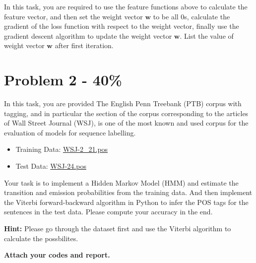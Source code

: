 \documentclass{article}
\begin{document}
In this task, you are required to use the feature functions above to calculate the feature vector,
and then set the weight vector $\mathbf{w}$ to be all 0s,
calculate the gradient of the loss function with respect to the weight vector,
finally use the gradient descent algorithm to update the weight vector $\mathbf{w}$.
List the value of weight vector $\mathbf{w}$ after first iteration. 

\section*{Problem 2 - 40\%}

In this task, you are provided The English Penn Treebank (PTB) corpus with tagging, 
and in particular the section of the corpus corresponding 
to the articles of Wall Street Journal (WSJ), 
is one of the most known and used corpus for the evaluation of models for sequence labelling.

\begin{itemize}
    \item Training Data: \href{https://drive.google.com/file/d/16H4D4nsntZVA4sXslWAy2nl8BX_gxofM/view?usp=sharing}{WSJ-2\_21.pos}
    \item Test Data: \href{https://drive.google.com/file/d/1yl_ea9VznZuauavGMLfLHxzcZf2yPil3/view?usp=sharing}{WSJ-24.pos}
\end{itemize}

Your task is to implement a Hidden Markov Model (HMM) and 
estimate the transition and emission probabilities from the training data.
And then implement the Viterbi forward-backward algorithm in Python
to infer the POS tags for the sentences in the test data. Please
compute your accuracy in the end. 

\textbf{Hint:} Please go through the dataset first and use the Viterbi algorithm to calculate the possbilites.

\textbf{Attach your codes and report.}
\end{document}
